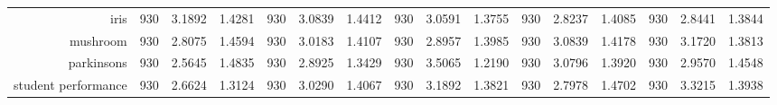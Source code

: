 \begin{table}[H]
{\begin{tabular}{rccccccccccccccc}
			iris                                & 930                                 & 3.1892                                                                    & 1.4281          & 930                                & 3.0839                                                                             & 1.4412          & 930                                & 3.0591                                                                    & 1.3755          & 930                                & \cellcolor[rgb]{ .776,  .937,  .808}\textcolor[rgb]{ 0,  .38,  0}{2.8237} & 1.4085          & 930                                    & 2.8441                                                                    & 1.3844          \\
			mushroom                            & 930                                 & \cellcolor[rgb]{ .776,  .937,  .808}\textcolor[rgb]{ 0,  .38,  0}{2.8075} & 1.4594          & 930                                & 3.0183                                                                             & 1.4107          & 930                                & 2.8957                                                                    & 1.3985          & 930                                & 3.0839                                                                    & 1.4178          & 930                                    & 3.1720                                                                    & 1.3813          \\
			parkinsons                          & 930                                 & \cellcolor[rgb]{ .776,  .937,  .808}\textcolor[rgb]{ 0,  .38,  0}{2.5645} & 1.4835          & 930                                & 2.8925                                                                             & 1.3429          & 930                                & 3.5065                                                                    & 1.2190          & 930                                & 3.0796                                                                    & 1.3920          & 930                                    & 2.9570                                                                    & 1.4548          \\
			student performance                 & 930                                 & \cellcolor[rgb]{ .776,  .937,  .808}\textcolor[rgb]{ 0,  .38,  0}{2.6624} & 1.3124          & 930                                & 3.0290                                                                             & 1.4067          & 930                                & 3.1892                                                                    & 1.3821          & 930                                & 2.7978                                                                    & 1.4702          & 930                                    & 3.3215                                                                    & 1.3938          \\

\end{tabular}}
\end{table}
